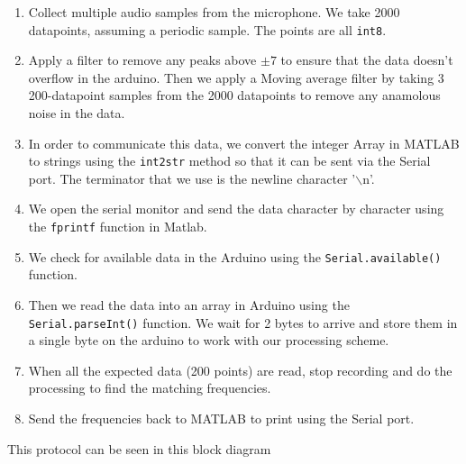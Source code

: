 \begin{enumerate}
    \item Collect multiple audio samples from the microphone. We take 2000
    datapoints, assuming a periodic sample. The points are all \texttt{int8}.

    \item Apply a filter to remove any peaks above \(\pm7\) to ensure that the
    data doesn't overflow in the arduino. Then we apply a Moving average filter
    by taking 3 200-datapoint samples from the 2000 datapoints to remove any
    anamolous noise in the data.

    \item In order to communicate this data, we convert the integer Array in
    MATLAB to strings using the \texttt{int2str} method so that it can be sent
    via the Serial port. The terminator that we use is the newline character
    '$\backslash$n'.

    \item We open the serial monitor and send the data character by character
    using the \texttt{fprintf} function in Matlab.

    \item We check for available data in the Arduino using the
    \texttt{Serial.available()} function.

    \item Then we read the data into an array in Arduino using the
    \texttt{Serial.parseInt()} function. We wait for 2 bytes to arrive and store
    them in a single byte on the arduino to work with our processing scheme.
    
    \item When all the expected data (200 points) are read, stop recording and
    do the processing to find the matching frequencies. 

    \item Send the frequencies back to MATLAB to print using the Serial port. 
\end{enumerate}
This protocol can be seen in this block diagram 
